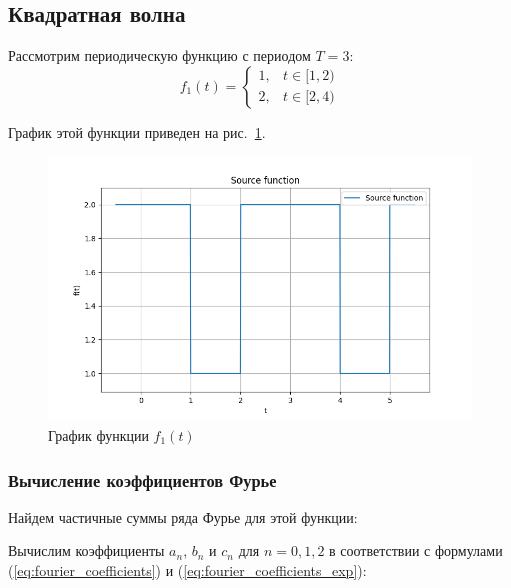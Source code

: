 \subsection{Квадратная волна}

Рассмотрим периодическую функцию с периодом $T = 3$:
\begin{equation}
    f_1(t) = 
    \begin{cases}
        1, & t \in [1, 2) \\
        2, & t \in [2, 4)
    \end{cases}
    \label{eq:func_1}
\end{equation}

График этой функции приведен на рис.~\ref{fig:func_1}. 
\begin{figure}[ht!]
    \centering
    \includegraphics[width=\textwidth]{media/plots/func_1.png}
    \caption{График функции $f_1(t)$}
    \label{fig:func_1}
\end{figure}

\subsubsection{Вычисление коэффициентов Фурье}
Найдем частичные суммы ряда Фурье для этой функции:

Вычислим коэффициенты $a_n$, $b_n$ и $c_n$ для $n = 0, 1, 2$ в соответствии с формулами (\ref{eq:fourier_coefficients}) и (\ref{eq:fourier_coefficients_exp}): 

